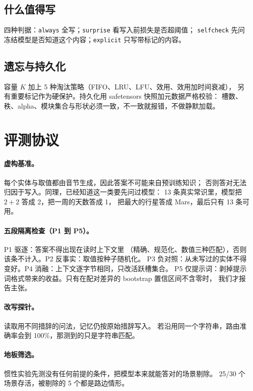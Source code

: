 \documentclass[11pt]{ctexart}
\begin{document}
\subsection{什么值得写}
四种判据：\texttt{always} 全写；\texttt{surprise} 看写入前损失是否超阈值；
\texttt{selfcheck} 先问冻结模型是否知道这个内容；\texttt{explicit} 只写带标记的内容。

\subsection{遗忘与持久化}
容量 $K$ 加上 5 种淘汰策略（FIFO、LRU、LFU、效用、效用加时间衰减），
另有重要标记作为硬保护。持久化用 safetensors 快照加元数据严格校验：
槽数、秩、alpha、模块集合与形状必须一致，不一致就报错，不做静默加载。

\section{评测协议}
\label{sec:protocol}

\paragraph{虚构基准。}每个实体与取值都由音节生成，因此答案不可能来自预训练知识；
否则答对无法归因于写入。同理，已经知道这一类要先问过模型：
13 条真实常识里，模型把 $2+2$ 答成 2，把一周的天数答成 1，
把最大的行星答成 Mars，最后只有 13 条可用。

\paragraph{五段隔离检查（P1 到 P5）。}P1 驱逐：答案不得出现在读时上下文里
（精确、规范化、数值三种匹配），否则该条不计入。P2 反事实：取值按种子随机化。
P3 负对照：从未写过的实体不得变好。P4 消融：上下文逐字节相同，只改活跃槽集合。
P5 仅提示词：剥掉提示词格式带来的收益。只有在配对差异的 bootstrap 置信区间不含零时，
我们才报告主张。

\paragraph{改写探针。}读取用不同措辞的问法，记忆仍按原始措辞写入。
若沿用同一个字符串，路由准确率会到 100\%，那测到的只是字符串匹配。

\paragraph{地板筛选。}惯性实验先测没有任何前提的条件，把模型本来就能答对的场景剔除。
25/30 个场景存活，被剔除的 5 个都是路边情形。
\end{document}
